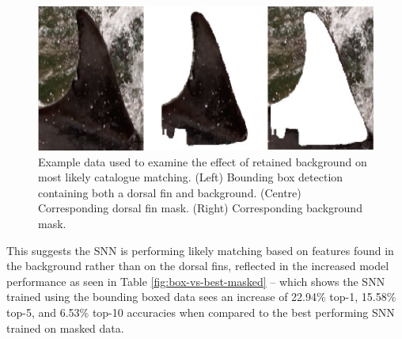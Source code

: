 \begin{figure}
	\begin{center}
		\includegraphics[scale=0.5]{Chapter7/figs/embedding-check-images.jpg}
	\end{center}
	\caption[Example data used to examine the effect of retained background on most likely catalogue matching.]{Example data used to examine the effect of retained background on most likely catalogue matching. (Left) Bounding box detection containing both a dorsal fin and background. (Centre) Corresponding dorsal fin mask. (Right) Corresponding background mask.}
	\label{fig:bboxvsmask}
\end{figure}

This suggests the SNN is performing likely matching based on features found in the background rather than on the dorsal fins, reflected in the increased model performance as seen in Table \ref{fig:box-vs-best-masked} -- which shows the SNN trained using the bounding boxed data sees an increase of 22.94\% top-1, 15.58\% top-5, and 6.53\% top-10 accuracies when compared to the best performing SNN trained on masked data.

